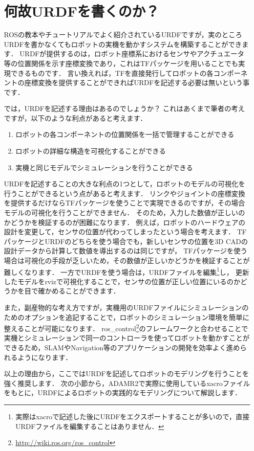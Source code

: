 \documentclass[{../../master}]{subfiles}
\begin{document}
\section{何故URDFを書くのか？}

ROSの教本やチュートリアルでよく紹介されているURDFですが，実のところURDFを書かなくてもロボットの実機を動かすシステムを構築することができます．
URDFが提供するのは，ロボット座標系におけるセンサやアクチュエータ等の位置関係を示す座標変換であり，これはTFパッケージを用いることでも実現できるものです．
言い換えれば，TFを直接発行してロボットの各コンポーネントの座標変換を提供することができればURDFを記述する必要は無いという事です．

では，URDFを記述する理由はあるのでしょうか？
これはあくまで筆者の考えですが，以下のような利点があると考えます．

\begin{enumerate}
  \item ロボットの各コンポーネントの位置関係を一括で管理することができる
  \item ロボットの詳細な構造を可視化することができる
  \item 実機と同じモデルでシミュレーションを行うことができる
\end{enumerate}

URDFを記述することの大きな利点の1つとして，ロボットのモデルの可視化を行うことができるという点があると考えます．
リンクやジョイントの座標変換を提供するだけならTFパッケージを使うことで実現できるのですが，その場合モデルの可視化を行うことができません．
そのため，入力した数値が正しいのかどうかを検証するのが困難になります．
例えば，ロボットのハードウェアの設計を変更して，センサの位置が代わってしまったという場合を考えます．
TFパッケージとURDFのどちらを使う場合でも，新しいセンサの位置を3D CADの設計データから計算して数値を導出するのは同じですが，
TFパッケージを使う場合は可視化の手段が乏しいため，その数値が正しいかどうかを検証することが難しくなります．
一方でURDFを使う場合は，URDFファイルを編集\footnote{実際は\textsf{xacro}で記述した後にURDFをエクスポートすることが多いので，直接URDFファイルを編集することはありません．}し，
更新したモデルを\textsf{rviz}で可視化することで，センサの位置が正しい位置にいるのかどうかを目で確かめることができます．

また，副産物的な考え方ですが，実機用のURDFファイルにシミュレーションのためのオプションを追記することで，ロボットのシミュレーション環境を簡単に整えることが可能になります．
\textsf{ros\_control}\footnote{\url{http://wiki.ros.org/ros_control}}のフレームワークと合わせることで実機とシミュレーションで同一のコントローラを使ってロボットを動かすことができるため，SLAMやNavigation等のアプリケーションの開発を効率よく進められるようになります．

以上の理由から，ここではURDFを記述してロボットのモデリングを行うことを強く推奨します．
次の小節から，ADAMR2で実際に使用している\textsf{xacro}ファイルをもとに，URDFによるロボットの実践的なモデリングについて解説します．
\end{document}
